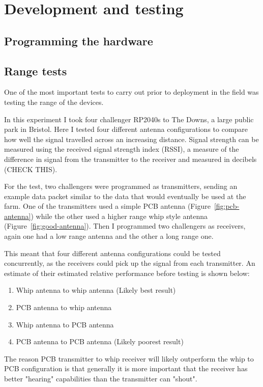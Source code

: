 \section{Development and testing}

\subsection{Programming the hardware}

\subsection{Range tests}

One of the most important tests to carry out prior to deployment in the field
was testing the range of the devices.

In this experiment I took four challenger RP2040s to The Downs, a large public
park in Bristol. Here I tested four different antenna configurations to compare
how well the signal travelled across an increasing distance. Signal strength can
be measured using the received signal strength index (RSSI), a measure of the
difference in signal from the transmitter to the receiver and measured in
decibels (CHECK THIS).

For the test, two challengers were programmed as transmitters, sending an
example data packet similar to the data that would eventually be used at the
farm. One of the transmitters used a simple PCB antenna
(Figure~\ref{fig:pcb-antenna}) while the other used a higher range whip style
antenna (Figure~\ref{fig:good-antenna}). Then I programmed two challengers as
receivers, again one had a low range antenna and the other a long range one.

This meant that four different antenna configurations could be tested
concurrently, as the receivers could pick up the signal from each transmitter.
An estimate of their estimated relative performance before testing is shown
below:

\begin{enumerate}
    \item Whip antenna to whip antenna (Likely best result)
    \item PCB antenna to whip antenna
    \item Whip antenna to PCB antenna
    \item PCB antenna to PCB antenna (Likely poorest result)
\end{enumerate}

The reason PCB transmitter to whip receiver will likely outperform the whip to
PCB configuration is that generally it is more important that the receiver has
better "hearing" capabilities than the transmitter can "shout".

